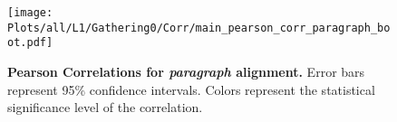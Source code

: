 \begin{figure*}[ht]
    \centering
    \texttt{[image: Plots/all/L1/Gathering0/Corr/main\_pearson\_corr\_paragraph\_boot.pdf]}
    \caption{\textbf{Pearson Correlations for \textit{paragraph} alignment.} Error bars represent 95\% confidence intervals. Colors represent the statistical significance level of the correlation.}
    \label{fig:main_pearson_corr_paragraph_boot}
\end{figure*}
    